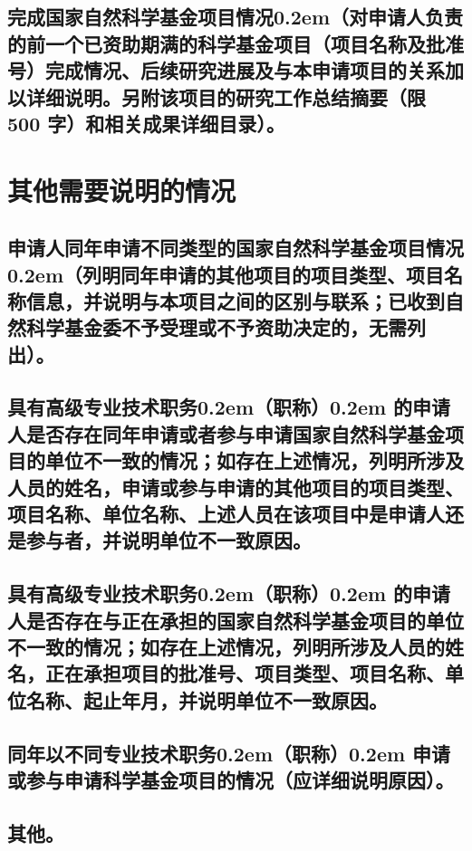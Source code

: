 \documentclass[YF]{nsfc}
\begin{document}
\section{\textbf{完成国家自然科学基金项目情况}\kern0.2em（对申请人负责的前一个已资助期满的科学基金项目（项目名称及批准号）完成情况、后续研究进展及与本申请项目的关系加以详细说明。另附该项目的研究工作总结摘要（限 500 字）和相关成果详细目录）。}

\chapter{\textbf{其他需要说明的情况}}
\section{申请人同年申请不同类型的国家自然科学基金项目情况\kern0.2em（列明同年申请的其他项目的项目类型、项目名称信息，并说明与本项目之间的区别与联系；已收到自然科学基金委不予受理或不予资助决定的，无需列出）。}

\section{具有高级专业技术职务\kern0.2em（职称）\kern0.2em 的申请人是否存在同年申请或者参与申请国家自然科学基金项目的单位不一致的情况；如存在上述情况，列明所涉及人员的姓名，申请或参与申请的其他项目的项目类型、项目名称、单位名称、上述人员在该项目中是申请人还是参与者，并说明单位不一致原因。}

\section{具有高级专业技术职务\kern0.2em（职称）\kern0.2em 的申请人是否存在与正在承担的国家自然科学基金项目的单位不一致的情况；如存在上述情况，列明所涉及人员的姓名，正在承担项目的批准号、项目类型、项目名称、单位名称、起止年月，并说明单位不一致原因。}

\section{同年以不同专业技术职务\kern0.2em（职称）\kern0.2em 申请或参与申请科学基金项目的情况（应详细说明原因）。}

\section{其他。}
\end{document}
